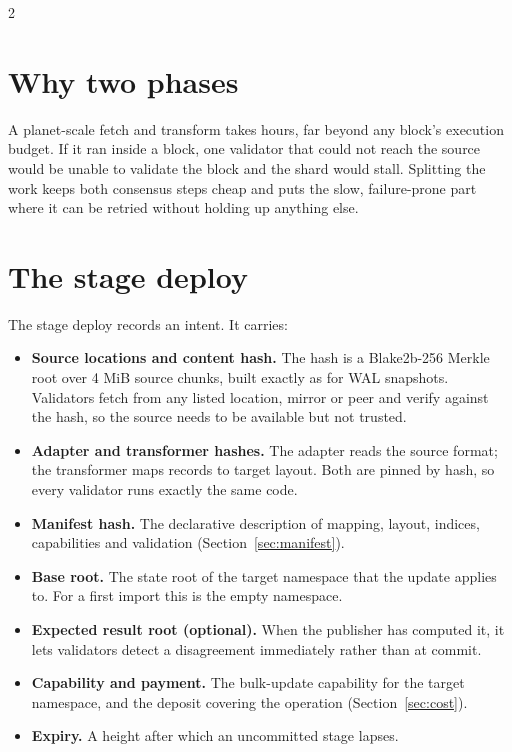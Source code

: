 \documentclass[10pt]{article}
\begin{document}
\begin{multicols}{2}

\section{Why two phases}

A planet-scale fetch and transform takes hours, far beyond any block's execution
budget. If it ran inside a block, one validator that could not reach the source
would be unable to validate the block and the shard would stall. Splitting the
work keeps both consensus steps cheap and puts the slow, failure-prone part where
it can be retried without holding up anything else.

\section{The stage deploy}

The stage deploy records an intent. It carries:

\begin{itemize}
\item \textbf{Source locations and content hash.} The hash is a Blake2b-256 Merkle
  root over 4 MiB source chunks, built exactly as for WAL snapshots. Validators fetch from any listed location,
  mirror or peer and verify against the hash, so the source needs to be available
  but not trusted.
\item \textbf{Adapter and transformer hashes.} The adapter reads the source format;
  the transformer maps records to target layout. Both are pinned by hash, so every
  validator runs exactly the same code.
\item \textbf{Manifest hash.} The declarative description of mapping, layout,
  indices, capabilities and validation (Section~\ref{sec:manifest}).
\item \textbf{Base root.} The state root of the target namespace that the update
  applies to. For a first import this is the empty namespace.
\item \textbf{Expected result root (optional).} When the publisher has computed it,
  it lets validators detect a disagreement immediately rather than at commit.
\item \textbf{Capability and payment.} The bulk-update capability for the target
  namespace, and the deposit covering the operation (Section~\ref{sec:cost}).
\item \textbf{Expiry.} A height after which an uncommitted stage lapses.
\end{itemize}


\end{multicols}
\end{document}
